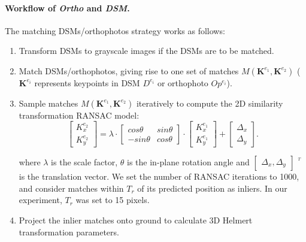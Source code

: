 \paragraph{Workflow of \textit{Ortho} and \textit{DSM}.} 
The matching DSMs/orthophotos strategy works as follows:\\
\begin{enumerate}
    \item Transform DSMs to grayscale images if the DSMs are to be matched.
    \item Match DSMs/orthophotos, giving rise to one set of matches $M({\mathbf{K}^{e_1},\mathbf{K}^{e_2}})$ ($\mathbf{K}^{e_i}$ represents keypoints in DSM $D^{e_i}$ or orthophoto $Op^{e_i}$).
    \item Sample matches $M({\mathbf{K}^{e_1},\mathbf{K}^{e_2}})$ iteratively to compute the 2D similarity transformation RANSAC model:
\begin{equation}
\left [ \begin{array}{c}
{K}_x^{e_2}\\
{K}_y^{e_2}
\end{array}
\right ] =\lambda \cdot { \left[ \begin{array}{cc}
    cos\theta & sin\theta\\
    -sin\theta & cos\theta
    \end{array} 
    \right ]} \cdot {\left [ \begin{array}{c}
    {K}_x^{e_1}\\
    {K}_y^{e_1}
    \end{array}
    \right ]} + \left [ \begin{array}{c}
\Delta_x\\
\Delta_y
\end{array}
\right ]. \label{eq:2DSim}
\end{equation}

    where $\lambda$ is the scale factor, $\theta$ is the in-plane rotation angle and $\left [ \begin{array}{c}
    \Delta_x, \Delta_y
    \end{array}
    \right ]$ $^{^T}$ is the translation vector.
    We set the number of RANSAC iterations to 1000, and consider matches within $T_r$ of its predicted position as inliers. In our experiment, {$T_r$ was set to 15 pixels.}
    \item Project the inlier matches onto ground to calculate 3D Helmert transformation parameters.
\end{enumerate}

